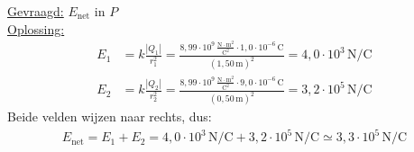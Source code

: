 \documentclass{ximera}
\begin{document}
\begin{exercise}
\begin{question}
\begin{solution}
            \underline{Gevraagd:} $E_{\text{net}}$ in $P$\\

            \underline{Oplossing:}\\
            \begin{align*}
                E_{1} &= k \frac{|Q_{1}|}{r_{1}^{2}} = \frac{8{,}99 \cdot 10^{9} \, \mathrm{\frac{N \cdot m^2}{C^2}} \cdot 1{,}0 \cdot 10^{-6} \, \mathrm{C}}{(1{,}50 \, \mathrm{m})^{2}} = 4{,}0 \cdot 10^{3} \, \mathrm{N/C} \\
                E_{2} &= k \frac{|Q_{2}|}{r_{2}^{2}} = \frac{8{,}99 \cdot 10^{9} \, \mathrm{\frac{N \cdot m^2}{C^2}} \cdot 9{,}0 \cdot 10^{-6} \, \mathrm{C}}{(0{,}50 \, \mathrm{m})^{2}} = 3{,}2 \cdot 10^{5} \, \mathrm{N/C}
            \end{align*}
            Beide velden wijzen naar rechts, dus:
            \begin{align*}
                E_{\text{net}} = E_1 + E_2 = 4{,}0 \cdot 10^{3} \, \mathrm{N/C} + 3{,}2 \cdot 10^{5} \, \mathrm{N/C} \simeq \boxed{3{,}3 \cdot 10^{5} \, \mathrm{N/C}}
            \end{align*}
        \end{solution}
    \end{question}
\end{exercise}
\end{document}
